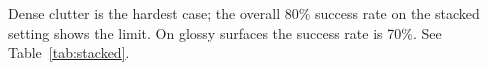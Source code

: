 \documentclass{article}
\begin{document}
Dense clutter is the hardest case; the overall 80\% success rate on the stacked setting shows the limit.
On glossy surfaces the success rate is 70\%.
See Table~\ref{tab:stacked}.
\begin{table}[h]
\centering
\caption{\textbf{Success rates of our method under varying conditions.}}
\label{tab:stacked}
\end{table}
\nocite{*}
\end{document}
